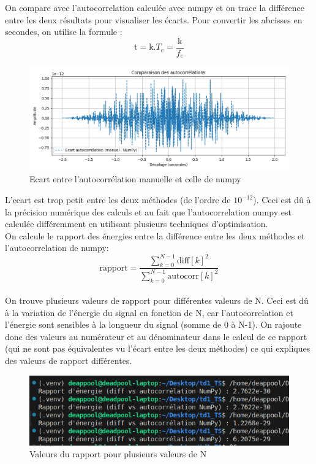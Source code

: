 On compare avec l'autocorrelation calculée avec numpy et on trace la différence entre les deux résultats pour visualiser les écarts.
Pour convertir les abcisses en secondes, on utilise la formule :  
\[ \text{t} = {\text{k}}.{T_e} = \frac{\text{k}}{f_e} \]

\begin{figure}[!h]
\centering
\includegraphics[width=17cm]{screenshots/ecart_autocorrelation.png}
\caption{Ecart entre l'autocorrélation manuelle et celle de numpy}
\end{figure} 

L'ecart est trop petit entre les deux méthodes (de l'ordre de \(10^{-12}\)). Ceci est dû à la précision numérique des calculs et au fait que l'autocorrelation numpy est calculée différemment en utilisant plusieurs techniques d'optimisation.\\

On calcule le rapport des énergies entre la différence entre les deux méthodes et l'autocorrelation de numpy:
\[ \text{rapport} = \frac{\sum_{k=0}^{N-1} \text{diff}[k]^2}{\sum_{k=0}^{N-1} \text{autocorr}[k]^2} \] \\

On trouve plusieurs valeurs de rapport pour différentes valeurs de N. Ceci est dû à la variation de l'énergie du signal en fonction de N, car l'autocorrelation et l'énergie sont sensibles à la longueur du signal (somme de 0 à N-1). On rajoute donc des valeurs au numérateur et au dénominateur dans le calcul de ce rapport (qui ne sont pas équivalentes vu l'écart entre les deux méthodes) ce qui expliques des valeurs de rapport différentes.

\begin{figure}[!h]
\centering
\includegraphics[width=17cm]{screenshots/valeur_rapport.png}
\caption{Valeurs du rapport pour plusieurs valeurs de N}
\end{figure} 